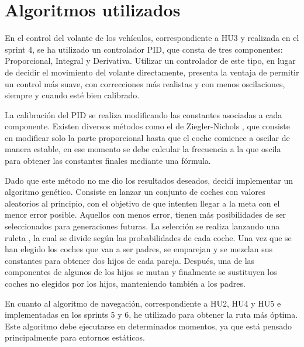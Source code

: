 
\section{Algoritmos utilizados}
En el control del volante de los vehículos, correspondiente a HU3 y realizada en el sprint 4, se ha utilizado un controlador PID, que consta de tres componentes: Proporcional, Integral y Derivativa. Utilizar un controlador de este tipo, en lugar de decidir el movimiento del volante directamente, presenta la ventaja de permitir un control más suave, con correcciones más realistas y con menos oscilaciones, siempre y cuando esté bien calibrado.

\bigskip

La calibración del PID se realiza modificando las constantes asociadas a cada componente. Existen diversos métodos como el de Ziegler-Nichols \cite{enwiki:1140258750}, que consiste en modificar solo la parte proporcional hasta que el coche comience a oscilar de manera estable, en ese momento se debe calcular la frecuencia a la que oscila para obtener las constantes finales mediante una fórmula. 

\bigskip

Dado que este método no me dio los resultados deseados, decidí implementar un algoritmo genético. Consiste en lanzar un conjunto de coches con valores aleatorios al principio, con el objetivo de que intenten llegar a la meta con el menor error posible. Aquellos con menos error, tienen más posibilidades de ser seleccionados para generaciones futuras. La selección se realiza lanzando una ruleta \cite{enwiki:1141636554}, la cual se divide según las probabilidades de cada coche. Una vez que se han elegido los coches que van a ser padres, se emparejan y se mezclan sus constantes para obtener dos hijos de cada pareja. Después, una de las componentes de algunos de los hijos se mutan y finalmente se sustituyen los coches no elegidos por los hijos, manteniendo también a los padres.

\bigskip

En cuanto al algoritmo de navegación, correspondiente a HU2, HU4 y HU5 e implementadas en los sprints 5 y 6, he utilizado \finalAlg para obtener la ruta más óptima. Este algoritmo debe ejecutarse en determinados momentos, ya que está pensado principalmente para entornos estáticos.

